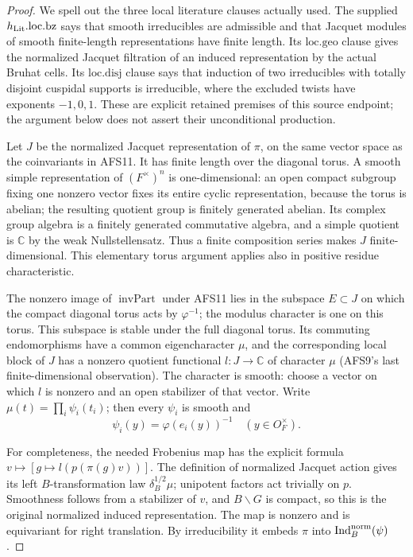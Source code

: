 \documentclass[11pt,a4paper]{article}
\numberwithin{equation}{section}
\theoremstyle{remark}\newtheorem{remark}[theorem]{Remark}
\begin{document}
\begin{proof}
We spell out the three local literature clauses actually used.
The supplied $h_{\rm Lit}.\mathrm{loc.bz}$ says that smooth
irreducibles are admissible and that Jacquet modules of smooth
finite-length representations have finite length.  Its
$\mathrm{loc.geo}$ clause gives the normalized Jacquet
filtration of an induced representation by the actual Bruhat
cells.  Its $\mathrm{loc.disj}$ clause says that induction of
two irreducibles with totally disjoint cuspidal supports is
irreducible, where the excluded twists have exponents
$-1,0,1$.  These are explicit retained premises of this
source endpoint; the argument below does not assert their
unconditional production.

Let $J$ be the normalized Jacquet representation of $\pi$,
on the same vector space as the coinvariants in AFS11.  It
has finite length over the diagonal torus.  A smooth simple
representation of $(F^\times)^n$ is one-dimensional: an
open compact subgroup fixing one nonzero vector fixes its
entire cyclic representation, because the torus is abelian;
the resulting quotient group is finitely generated abelian.
Its complex group algebra is a finitely generated
commutative algebra, and a simple quotient is $\mathbb C$
by the weak Nullstellensatz.  Thus a finite composition
series makes $J$ finite-dimensional.  This elementary torus
argument applies also in positive residue characteristic.

The nonzero image of $\operatorname{invPart}$ under AFS11
lies in the subspace $E\subset J$ on which the compact
diagonal torus acts by $\varphi^{-1}$; the modulus character
is one on this torus.  This subspace is stable under the
full diagonal torus.  Its commuting endomorphisms have a
common eigencharacter $\mu$, and the corresponding local
block of $J$ has a nonzero quotient functional
$l:J\to\mathbb C$ of character $\mu$ (AFS9's last
finite-dimensional observation).  The character is smooth:
choose a vector on which $l$ is nonzero and an open
stabilizer of that vector.  Write
$\mu(t)=\prod_i\psi_i(t_i)$; then every $\psi_i$ is smooth
and
\[
                 \psi_i(y)=\varphi(e_i(y))^{-1}
                                      \quad(y\in O_F^\times).
\]

For completeness, the needed Frobenius map has the explicit
formula $v\mapsto[g\mapsto l(p(\pi(g)v))]$.
The definition of normalized Jacquet action gives its left
$B$-transformation law $\delta_B^{1/2}\mu$; unipotent factors
act trivially on $p$.  Smoothness follows from a stabilizer
of $v$, and $B\backslash G$ is compact, so this is the
original normalized induced representation.  The map is
nonzero and is equivariant for right translation.  By
irreducibility it embeds $\pi$ into
$\operatorname{Ind}^{\rm norm}_B(\psi)$.


\end{proof}
\end{document}
